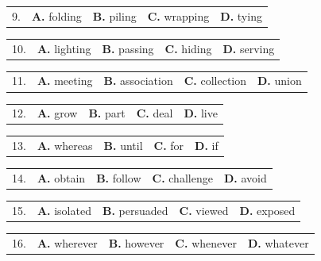 \documentclass[UTF8,11pt]{ctexart}
\begin{document}
\noindent\begin{tabularx}{\linewidth}{@{}lXXXX@{}}9. & \textbf{A.} folding & \textbf{B.} piling & \textbf{C.} wrapping & \textbf{D.} tying\\\end{tabularx}\par

\noindent\begin{tabularx}{\linewidth}{@{}lXXXX@{}}10. & \textbf{A.} lighting & \textbf{B.} passing & \textbf{C.} hiding & \textbf{D.} serving\\\end{tabularx}\par

\noindent\begin{tabularx}{\linewidth}{@{}lXXXX@{}}11. & \textbf{A.} meeting & \textbf{B.} association & \textbf{C.} collection & \textbf{D.} union\\\end{tabularx}\par

\noindent\begin{tabularx}{\linewidth}{@{}lXXXX@{}}12. & \textbf{A.} grow & \textbf{B.} part & \textbf{C.} deal & \textbf{D.} live\\\end{tabularx}\par

\noindent\begin{tabularx}{\linewidth}{@{}lXXXX@{}}13. & \textbf{A.} whereas & \textbf{B.} until & \textbf{C.} for & \textbf{D.} if\\\end{tabularx}\par

\noindent\begin{tabularx}{\linewidth}{@{}lXXXX@{}}14. & \textbf{A.} obtain & \textbf{B.} follow & \textbf{C.} challenge & \textbf{D.} avoid\\\end{tabularx}\par

\noindent\begin{tabularx}{\linewidth}{@{}lXXXX@{}}15. & \textbf{A.} isolated & \textbf{B.} persuaded & \textbf{C.} viewed & \textbf{D.} exposed\\\end{tabularx}\par

\noindent\begin{tabularx}{\linewidth}{@{}lXXXX@{}}16. & \textbf{A.} wherever & \textbf{B.} however & \textbf{C.} whenever & \textbf{D.} whatever\\\end{tabularx}\par
\end{document}

